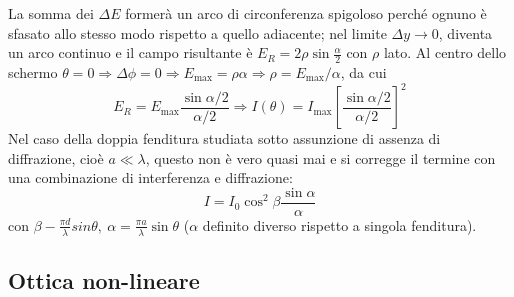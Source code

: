 \documentclass[a4paper]{scrartcl}
\numberwithin{equation}{subsection}
\theoremstyle{style1}
\begin{document}
La somma dei $\Delta E$ former\`a un arco di circonferenza spigoloso perch\'e ognuno \`e sfasato allo stesso modo rispetto a quello adiacente; nel limite $\Delta y\to 0$, diventa un arco continuo e il campo risultante \`e $E_R = 2 \rho  \sin \frac{\alpha}{2}$ con $\rho $ lato. Al centro dello schermo $\theta =0\Rightarrow \Delta \phi = 0 \Rightarrow E_\text{max}= \rho  \alpha \Rightarrow \rho  = E_\text{max}/\alpha $, da cui 
\begin{equation}
	E_R = E_\text{max} \frac{\sin \alpha  /2 }{\alpha  / 2}\Rightarrow I(\theta ) = I_\text{max}\left[ \frac{\sin \alpha  / 2}{\alpha  / 2} \right] ^2
\end{equation}
Nel caso della doppia fenditura studiata sotto assunzione di assenza di diffrazione, cio\`e $a \ll\lambda $, questo non \`e vero quasi mai e si corregge il termine con una combinazione di interferenza e diffrazione:
\begin{equation}
	I = I_0 \cos^2 \beta  \frac{\sin\alpha }{\alpha }
\end{equation}
con $\beta  - \frac{\pi d}{\lambda }sin \theta , \ \alpha  = \frac{\pi a }{\lambda }\sin \theta $ ($\alpha $ definito diverso rispetto a singola fenditura).
\subsection{Ottica non-lineare}
\end{document}
